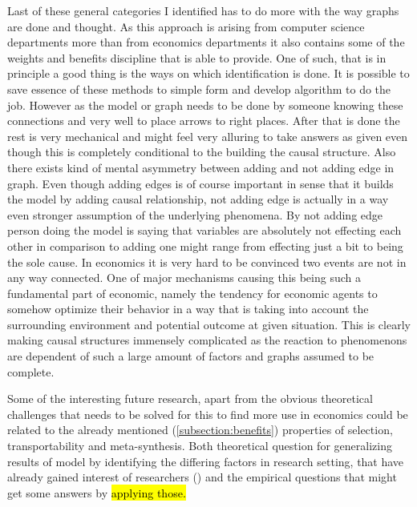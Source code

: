 \documentclass[main=english,12pt,a4paper,pdftex,econ,utf8]{aaltothesis}
\begin{document}
Last of these general categories I identified has to do more with the way graphs are done and thought. As this approach is arising from computer science departments more than from economics departments it also contains some of the weights and benefits discipline that is able to provide. One of such, that is in principle a good thing is the ways on which identification is done. It is possible to save essence of these methods to simple form and develop algorithm to do the job. However as the model or graph needs to be done by someone knowing these connections and very well to place arrows to right places. After that is done the rest is very mechanical and might feel very alluring to take answers as given even though this is completely conditional to the building the causal structure. Also there exists kind of mental asymmetry between adding and not adding edge in graph. Even though adding edges is of course important in sense that it builds the model by adding causal relationship, not adding edge is actually in a way even stronger assumption of the underlying phenomena. By not adding edge person doing the model is saying that variables are absolutely not effecting each other in comparison to adding one might range from effecting just a bit to being the sole cause. In economics it is very hard to be convinced two events are not in any way connected. One of major mechanisms causing this being such a fundamental part of economic, namely the tendency for economic agents to somehow optimize their behavior in a way that is taking into account the surrounding environment and potential outcome at given situation. This is clearly making causal structures immensely complicated as the reaction to phenomenons are dependent of such a large amount of factors and graphs assumed to be complete.

Some of the interesting future research, apart from the obvious theoretical challenges that needs to be solved for this to find more use in economics could be related to the already mentioned (\ref{subsection:benefits}) properties of selection, transportability and meta-synthesis. Both theoretical question for generalizing results of model by identifying the differing factors in research setting, that have already gained interest of researchers (\cite{Cinelli2021}) and the empirical questions that might get some answers by \hl{applying those.}
\end{document}
